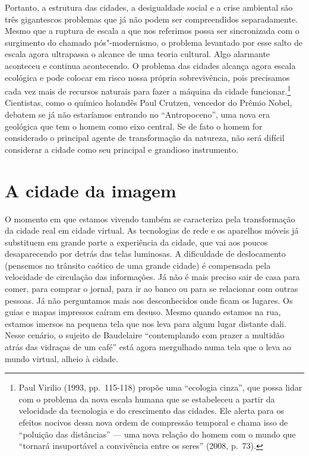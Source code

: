Portanto, a estrutura das cidades, a desigualdade social e a crise ambiental são três gigantescos problemas que já não podem ser compreendidos separadamente. Mesmo que a ruptura de escala a que nos referimos possa ser
sincronizada com o surgimento do chamado pós"-modernismo, o problema
levantado por esse salto de escala agora ultrapassa o alcance de uma
teoria cultural. Algo alarmante aconteceu e continua acontecendo. O
problema das cidades alcança agora escala ecológica e pode colocar em
risco nossa própria sobrevivência, pois precisamos cada vez mais de
recursos naturais para fazer a máquina da cidade funcionar.\footnote{Paul
  Virilio (1993, pp.~115-118) propõe uma ``ecologia cinza'', que possa
  lidar com o problema da nova escala humana que se estabeleceu a partir
  da velocidade da tecnologia e do crescimento das cidades. Ele alerta
  para os efeitos nocivos dessa nova ordem de compressão temporal e
  chama isso de ``poluição das distâncias'' --- uma nova relação do homem
  com o mundo que ``tornará insuportável a convivência entre os seres''
  (2008, p.~73).} Cientistas, como o químico holandês Paul Crutzen,
vencedor do Prêmio Nobel, debatem se já não estaríamos entrando no
``Antropoceno'', uma nova era geológica que tem o homem como eixo
central. Se de fato o homem for considerado o principal agente de
transformação da natureza, não será difícil considerar a cidade como seu
principal e grandioso instrumento.

\chapter{A cidade da imagem}

O momento em que estamos vivendo também se caracteriza pela
transformação da cidade real em cidade virtual. As tecnologias de rede e
os aparelhos móveis já substituem em grande parte a experiência da
cidade, que vai aos poucos desaparecendo por detrás das telas luminosas.
A dificuldade de deslocamento (pensemos no trânsito caótico de uma
grande cidade) é compensada pela velocidade de circulação das
informações. Já não é mais preciso sair de casa para comer, para comprar
o jornal, para ir ao banco ou para se relacionar com outras pessoas. Já
não perguntamos mais aos desconhecidos onde ficam os lugares. Os guias e
mapas impressos caíram em desuso. Mesmo quando estamos na rua, estamos
imersos na pequena tela que nos leva para algum lugar distante dali.
Nesse cenário, o sujeito de Baudelaire ``contemplando com prazer a
multidão atrás das vidraças de um café'' está agora mergulhado numa tela
que o leva ao mundo virtual, alheio à cidade.

